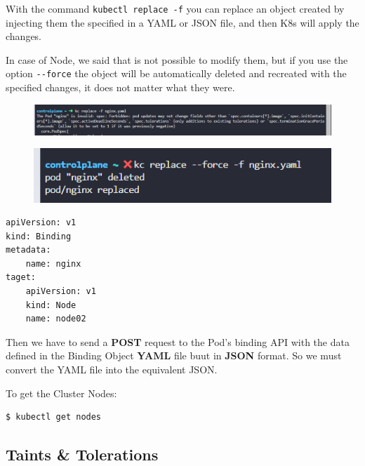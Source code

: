 \documentclass{article}
\newenvironment{blocktemplateIII}[1]{%
    \tcolorbox[beamer,%
    noparskip,breakable,
    ,colframe=Red,%
    colbacklower=LimeGreen!75!LightGreen,%
    title=#1]}%
    {\endtcolorbox}
\newenvironment{codetemplate}[1][]{%
  \mybasecolorbox[#1]
  \itshape
}{%
  \endmybasecolorbox
}
\begin{document}
\begin{blocktemplateIII}{NOTE:}
With the command \verb|kubectl replace -f| you can replace an object created by injecting them the specified in a YAML or JSON file, and then K8s will apply the changes.

In case of Node, we said that is not possible to modify them, but if you use the option \verb|--force| the object will be automatically deleted and recreated with the specified changes, it does not matter what they were.
\begin{figure}[H]
    \centering
    \includegraphics[width=\textwidth]{pictures/sch1.png}
\end{figure}
\begin{figure}[H]
    \centering
    \includegraphics[scale=0.6]{pictures/sch2.png}
\end{figure}
\end{blocktemplateIII}

\begin{codetemplate}{}
\begin{verbatim}
apiVersion: v1
kind: Binding
metadata:
    name: nginx
taget:
    apiVersion: v1
    kind: Node
    name: node02
\end{verbatim}
\end{codetemplate}

Then we have to send a \textbf{POST} request to the Pod's binding API with the data defined in the Binding Object \textbf{YAML} file buut in \textbf{JSON} format. So we must convert the YAML file into the equivalent JSON.

To get the Cluster Nodes:

\begin{codetemplate}{}
\begin{verbatim}
$ kubectl get nodes
\end{verbatim}
\end{codetemplate}

\subsection{Taints \& Tolerations}
\end{document}
